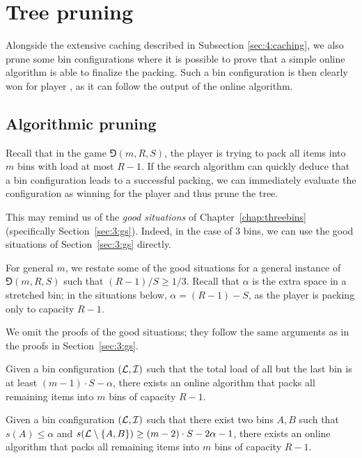 \section{Tree pruning}\label{sec:4:pruning}

Alongside the extensive caching described in Subsection
\ref{sec:4:caching}, we also prune some bin configurations where it is
possible to prove that a simple online algorithm is able to finalize
the packing. Such a bin configuration is then clearly won for player
\algo, as it can follow the output of the online algorithm.

\subsection{Algorithmic pruning}\label{sec:4:gs}

Recall that in the game $\Game(m,R,S)$, the player \algo is trying to
pack all items into $m$ bins with load at most $R-1$. If the search
algorithm can quickly deduce that a bin configuration leads to a
successful packing, we can immediately evaluate the configuration as
winning for the player \algo and thus prune the tree.

This may remind us of the \emph{good situations} of
Chapter~\ref{chap:threebins} (specifically Section~\ref{sec:3:gs}).
Indeed, in the case of $3$ bins, we can use the good situations of
Section~\ref{sec:3:gs} directly.

For general $m$, we restate some of the good situations for a general
instance of $\Game(m,R,S)$ such that $(R-1)/S \ge 1/3$. Recall that $\alpha$
is the extra space in a stretched bin; in the situations below, $\alpha = (R-1) -S$,
as the player \algo is packing only to capacity $R-1$.

We omit the proofs of the good situations; they follow the same
arguments as in the proofs in Section~\ref{sec:3:gs}.


\setcounter{goodsit}{0}

\begin{goodsit}\label{lem:gs1generic}
Given a bin configuration $({\mathcal L},{\mathcal I})$ such that the total load
of all but the last bin is at least $(m-1)\cdot S - \alpha$,
there exists an online algorithm that packs all remaining items into
$m$ bins of capacity $R-1$.
\end{goodsit}

\begin{goodsit}\label{lem:gs2generic}
Given a bin configuration $({\mathcal L},{\mathcal I})$ such that there exist
two bins $A,B$ such that $s(A) \le \alpha$ and
$s({\mathcal L} \setminus \{A,B\}) \ge (m-2)\cdot S - 2\alpha - 1 $,
there exists an online algorithm that packs all remaining items into
$m$ bins of capacity $R-1$.
\end{goodsit}

